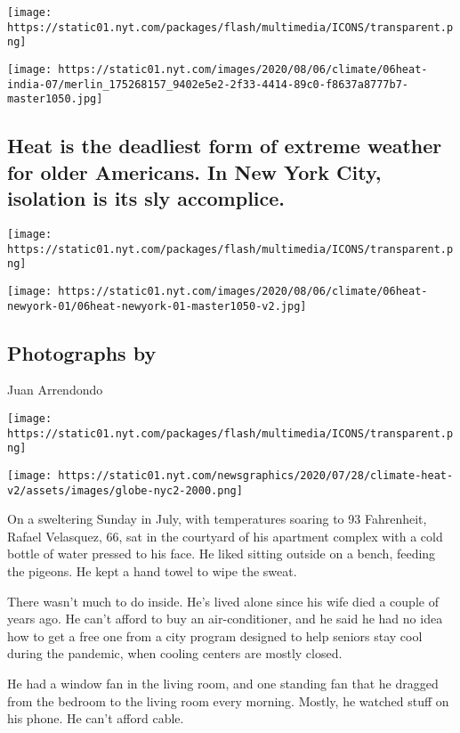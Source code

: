 \texttt{[image: https://static01.nyt.com/packages/flash/multimedia/ICONS/transparent.png]}

\texttt{[image: https://static01.nyt.com/images/2020/08/06/climate/06heat-india-07/merlin\_175268157\_9402e5e2-2f33-4414-89c0-f8637a8777b7-master1050.jpg]}

\hypertarget{heat-is-the-deadliest-form-of-extreme-weather-for-older-americans-in-new-york-city-isolation-is-its-sly-accomplice}{%
\subsection{Heat is the deadliest form of extreme weather for older
Americans. In New York City, isolation is its sly
accomplice.}\label{heat-is-the-deadliest-form-of-extreme-weather-for-older-americans-in-new-york-city-isolation-is-its-sly-accomplice}}

\texttt{[image: https://static01.nyt.com/packages/flash/multimedia/ICONS/transparent.png]}

\texttt{[image: https://static01.nyt.com/images/2020/08/06/climate/06heat-newyork-01/06heat-newyork-01-master1050-v2.jpg]}

\hypertarget{photographs-by-5}{%
\subsection{Photographs by}\label{photographs-by-5}}

Juan Arrendondo

\texttt{[image: https://static01.nyt.com/packages/flash/multimedia/ICONS/transparent.png]}

\texttt{[image: https://static01.nyt.com/newsgraphics/2020/07/28/climate-heat-v2/assets/images/globe-nyc2-2000.png]}

On a sweltering Sunday in July, with temperatures soaring to 93
Fahrenheit, Rafael Velasquez, 66, sat in the courtyard of his apartment
complex with a cold bottle of water pressed to his face. He liked
sitting outside on a bench, feeding the pigeons. He kept a hand towel to
wipe the sweat.

There wasn't much to do inside. He's lived alone since his wife died a
couple of years ago. He can't afford to buy an air-conditioner, and he
said he had no idea how to get a free one from a city program designed
to help seniors stay cool during the pandemic, when cooling centers are
mostly closed.

He had a window fan in the living room, and one standing fan that he
dragged from the bedroom to the living room every morning. Mostly, he
watched stuff on his phone. He can't afford cable.

